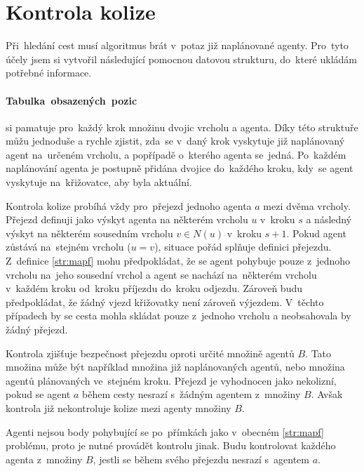 \section{Kontrola kolize}\label{sec:kolize}


Při~hledání cest musí algoritmus brát v~potaz již naplánované agenty.
Pro~tyto účely jsem si vytvořil následující pomocnou datovou strukturu, do~které ukládám potřebné informace.

\paragraph{Tabulka~obsazených~pozic}\label{par:obsazene_pozice} si pamatuje pro~každý krok množinu dvojic vrcholu a agenta.
Díky této struktuře můžu jednoduše a rychle zjistit,
zda~se v~daný krok vyskytuje již naplánovaný agent na~určeném vrcholu, a popřípadě o~kterého agenta se~jedná.
Po~každém naplánování agenta je postupně přidána dvojice do~každého kroku, kdy~se agent vyskytuje na~křižovatce,
aby byla  aktuální.

Kontrola kolize probíhá vždy pro~přejezd jednoho agenta $a$ mezi dvěma vrcholy.
Přejezd definuji jako výskyt agenta na některém vrcholu $u$ v~kroku $s$
a následný výskyt na některém sousedním vrcholu $v \in N(u)$ v~kroku $s + 1$.
Pokud agent zůstává na~stejném vrcholu ($u = v$), situace pořád splňuje definici přejezdu.
Z~definice \ref{str:mapf} mohu předpokládat, že se agent pohybuje pouze z~jednoho vrcholu na~jeho sousední vrchol a
agent se nachází na~některém vrcholu v~každém kroku od~kroku příjezdu do~kroku odjezdu.
Zároveň budu předpokládat, že žádný vjezd křižovatky není zároveň výjezdem.
V~těchto případech by se cesta mohla skládat pouze z~jednoho vrcholu a neobsahovala by žádný přejezd.

Kontrola zjišťuje bezpečnost přejezdu oproti určité množině agentů $B$.
Tato množina může být například množina již naplánovaných agentů, nebo množina agentů plánovaných ve~stejném kroku.
Přejezd je vyhodnocen jako nekolizní, pokud se agent $a$ během cesty nesrazí s~žádným agentem z~množiny $B$.
Avšak kontrola již nekontroluje kolize mezi agenty množiny $B$.

Agenti nejsou body pohybující se po~přímkách jako v~obecném \ref{str:mapf} problému,
proto je nutné provádět kontrolu jinak.
Budu kontrolovat každého agenta z~množiny $B$, jestli se během svého přejezdu nesrazí s~agentem $a$.

